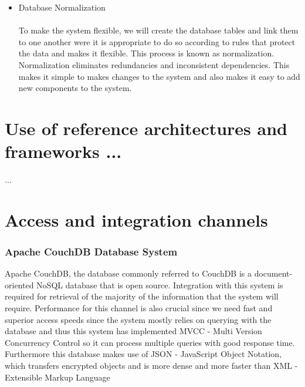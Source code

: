 \documentclass[a4paper]{article}
\begin{document}
\begin{itemize}
	\\
	\item Database Normalization \\\\
	To make the system flexible, we will create the database tables and link them to one another were it is appropriate to do so according to rules that protect the data and makes it flexible. This process is known as normalization. Normalization eliminates redundancies and inconsistent dependencies. This makes it simple to makes changes to the system and also makes it easy to add new components to the system.
	\\
\end{itemize}
\section{Use of reference architectures and frameworks ...}
	...\\ 
\section{Access and integration channels}
	\subsubsection{Apache CouchDB Database System}
	Apache CouchDB, the database commonly referred to CouchDB is a document-oriented NoSQL database that is open source. Integration with this system is required for retrieval of the majority of the information that the system will require. Performance for this channel is also crucial since we need fast and superior access speeds since the system mostly relies on querying with the database and thus this system has implemented MVCC - Multi Version Concurrency Control so it can process multiple queries with good response time. Furthermore this database makes use of JSON - JavaScript Object Notation, which transfers encrypted objects and is more dense and more faster than XML - Extensible Markup Language
\end{document}
